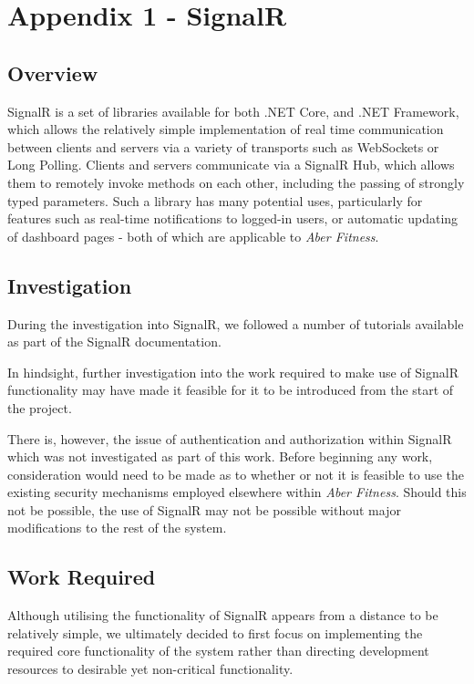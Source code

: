 \section{Appendix 1 - SignalR}

\subsection{Overview}

SignalR is a set of libraries available for both .NET Core, and .NET Framework, which allows the relatively simple implementation of real time communication between clients and servers via a variety of transports such as WebSockets or Long Polling\cite{SignalR}. Clients and servers communicate via a SignalR Hub, which allows them to remotely invoke methods on each other, including the passing of strongly typed parameters. Such a library has many potential uses, particularly for features such as real-time notifications to logged-in users, or automatic updating of dashboard pages - both of which are applicable to \textit{Aber Fitness}.

\subsection{Investigation}

During the investigation into SignalR, we followed a number of tutorials available as part of the SignalR documentation.

In hindsight, further investigation into the work required to make use of SignalR functionality may have made it feasible for it to be introduced from the start of the project.

There is, however, the issue of authentication and authorization within SignalR which was not investigated as part of this work. Before beginning any work, consideration would need to be made as to whether or not it is feasible to use the existing security mechanisms employed elsewhere within \textit{Aber Fitness}. Should this not be possible, the use of SignalR may not be possible without major modifications to the rest of the system.

\subsection{Work Required}

Although utilising the functionality of SignalR appears from a distance to be relatively simple, we ultimately decided to first focus on implementing the required core functionality of the system rather than directing development resources to desirable yet non-critical functionality.

